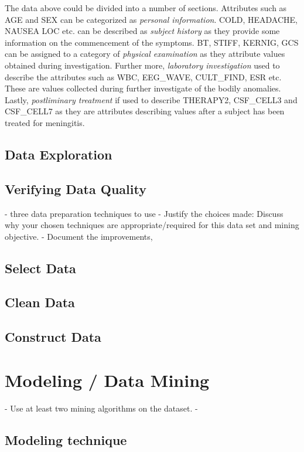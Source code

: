 The data above could be divided into a number of sections. Attributes such as AGE and SEX can be categorized as \textit{personal information}. COLD, HEADACHE, NAUSEA LOC etc. can be described as \textit{subject history} as they provide some information on the commencement of the symptoms. BT, STIFF, KERNIG, GCS can be assigned to a category of \textit{physical examination} as they attribute values obtained during investigation. Further more, \textit{laboratory investigation} used to describe the attributes such as WBC, EEG\_WAVE, CULT\_FIND, ESR etc. These are values collected during further investigate of the bodily anomalies. Lastly, \textit{postliminary treatment} if used to describe THERAPY2, CSF\_CELL3 and CSF\_CELL7 as they are attributes describing values after a subject has been treated for meningitis. 


\subsection*{Data Exploration}


\subsection*{Verifying Data Quality}



-  three data preparation techniques to use
- Justify the choices made: Discuss why your chosen techniques are appropriate/required for this data set and mining objective. 
- Document the improvements,

\subsection*{Select Data}
\subsection*{Clean Data}
\subsection*{Construct Data}


\section*{Modeling / Data Mining}

- Use at least two mining algorithms on the dataset. 
- 

\subsection*{Modeling technique}
